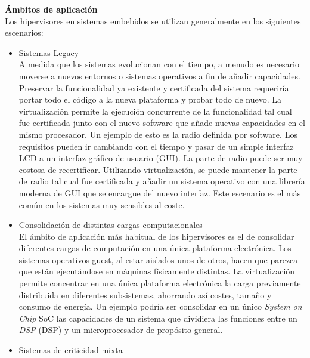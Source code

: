 \textbf{Ámbitos de aplicación}\\
Los hipervisores en sistemas embebidos se utilizan generalmente en los siguientes escenarios:
\begin{itemize}

	\item Sistemas Legacy\\
	A medida que los sistemas evolucionan con el tiempo, a menudo es necesario moverse a nuevos entornos o sistemas operativos a fin de añadir capacidades. Preservar la funcionalidad ya existente y certificada del sistema requeriría portar todo el código a la nueva plataforma y probar todo de nuevo. La virtualización permite la ejecución concurrente de la funcionalidad tal cual fue certificada junto con el nuevo software que añade nuevas capacidades en el mismo procesador. Un ejemplo de esto es la radio definida por software. Los requisitos pueden ir cambiando con el tiempo y pasar de un simple interfaz \acrshort{LCD} a un interfaz gráfico de usuario (\acrshort{GUI}). La parte de radio puede ser muy costosa de recertificar. Utilizando virtualización, se puede mantener la parte de radio tal cual fue certificada y añadir un sistema operativo con una librería moderna de \acrshort{GUI} que se encargue del nuevo interfaz.
	Este escenario es el más común en los sistemas muy sensibles al coste.\\
	\item Consolidación de distintas cargas computacionales\\
	El ámbito de aplicación más habitual de los hipervisores es el de consolidar diferentes cargas de computación en una única
	plataforma electrónica. Los sistemas operativos guest, al estar aislados unos de otros, hacen que parezca que están ejecutándose en máquinas físicamente distintas. La virtualización permite concentrar en una única plataforma electrónica la carga previamente distribuida en diferentes subsistemas, ahorrando así costes, tamaño y consumo de energía. Un ejemplo podría ser consolidar en un único \textit{System on Chip} \acrshort{SoC} las capacidades de un sistema que dividiera las funciones entre un \textit{\acrlong{DSP}} (\acrshort{DSP}) y un microprocesador de propósito general.\\
	\item Sistemas de criticidad mixta\\

\end{itemize}
